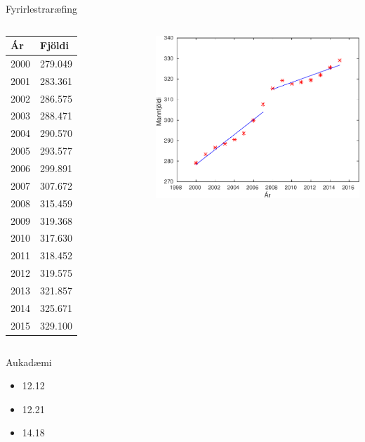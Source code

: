 \documentclass[handout]{beamer}
\begin{document}
\begin{frame}{Fyrirlestraræfing}
\begin{columns}
\scriptsize
\begin{tabular}{ll}
\toprule
Ár&Fjöldi\\
\midrule
2000&279.049\\
2001&283.361\\
2002&286.575\\
2003&288.471\\
2004&290.570\\
2005&293.577\\
2006&299.891\\
2007&307.672\\
2008&315.459\\
2009&319.368\\
2010&317.630\\
2011&318.452\\
2012&319.575\\
2013&321.857\\
2014&325.671\\
2015&329.100\\
\bottomrule
\end{tabular}

\includegraphics[width=\linewidth]{Pics/kreppa}
\end{columns}
\end{frame}

\begin{frame}{Aukadæmi}
    \begin{itemize}
        \item 12.12
        \item 12.21
        \item 14.18
    \end{itemize}
\end{frame}
\end{document}
